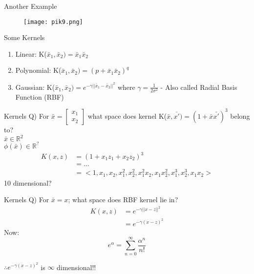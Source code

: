 \documentclass{beamer}
\begin{document}
	\begin{frame}{Another Example}
	    \begin{figure}
      
       \hspace{-0.4cm}\texttt{[image: pik9.png]}
      \end{figure}
	\end{frame}
	\begin{frame}{Some Kernels}
	    \begin{enumerate}
	        \item Linear: K($\bar{x}_{1}, \bar{x}_{2}) = \bar{x}_{1}\bar{x}_{2}$
	        \item Polynomial: K($\bar{x}_{1}, \bar{x}_{2}) = (p + \bar{x}_{1}\bar{x}_{2})^{q}$
	        \item Gaussian: K($\bar{x}_{1}, \bar{x}_{2}) = e^{-\gamma\lvert\lvert\bar{x}_{1} - \bar{x}_{2}\rvert\rvert^{2}}$ where $\gamma = \frac{1}{2\sigma^{2}}$ - Also called Radial Basis Function (RBF)
	    \end{enumerate}
	\end{frame}
	\begin{frame}{Kernels}
	    Q) For $\bar{x} = \begin{bmatrix}x_{1} \\ x_{2} \end{bmatrix}$ what space does kernel K($\bar{x}, \bar{x'}) = (1 + \bar{x}\bar{x'})^{3}$ belong to? \\
	    \hspace{0.5cm}
	    $\bar{x} \in \mathbb{R}^{2}$ \\ 
	    \hspace{0.5cm} $\phi(\bar{x}) \in \mathbb{R}^{?}$
	    \begin{align*}
	        K(x, z) &= (1 + x_{1}z_{1} + x_{2}z_{2})^{3} \\
	        &= \ldots \\
	        &= <1, x_{1}, x_{2}, x_{1}^{2}, x_{2}^{2}, x_{1}^{2}x_{2}, x_{1}x_{2}^{2}, x_{1}^{3}, x_{2}^{3}, x_1x_2>
	    \end{align*}
	    \hspace{3cm}10 dimensional?
	\end{frame}
	\begin{frame}{Kernels}
	    Q) For $\bar{x} = x$; what space does RBF kernel lie in? \\
	    \begin{align*}
	        K(x, z) &= e^{-\gamma\lvert\lvert x - z \rvert\rvert^{2}}\\
	        &= e^{-\gamma(x - z)^{2}}
	    \end{align*}
	    Now: $$e^{\alpha} = \sum_{n=0}^{\infty}\frac{\alpha^{n}}{n!}$$
	    
	    $\therefore e^{-\gamma(x - z)^{2}}$ is $\infty$ dimensional!!
	\end{frame}
\end{document}
